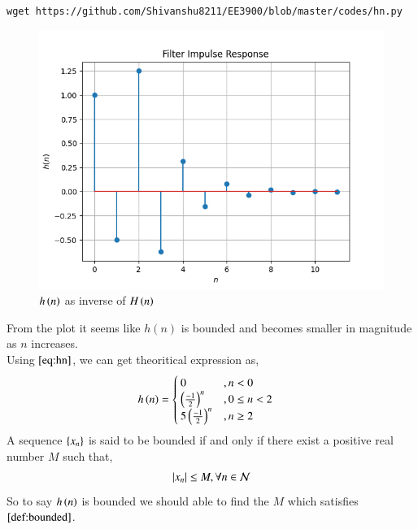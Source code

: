 \documentclass[journal,12pt,twocolumn]{IEEEtran}
\renewcommand\thesection{\arabic{section}}
\begin{document}
\begin{enumerate}[label=\thesection.\arabic*]
\begin{lstlisting}
wget https://github.com/Shivanshu8211/EE3900/blob/master/codes/hn.py
\end{lstlisting}
           \begin{figure}[ht!]
                \centering
                \includegraphics[width = \columnwidth]{figs/hn.png}
                \caption{$h\left(n\right)$ as inverse of $H\left(n\right)$}
                \label{hn}
           \end{figure}
           From the plot it seems like $h(n)$ is bounded and becomes smaller in magnitude as $n$ increases.\\
           Using $\eqref{eq:hn}$, we can get theoritical expression as,
           \begin{align}
                h\left(n\right) & = \begin{cases}
                                   0                      & , n < 0     \\
                                   \left(\frac{-1}{2}\right)^n  & , 0\leq n<2 \\
                                   5\left(\frac{-1}{2}\right)^n & , n \geq 2
                              \end{cases}\label{eq:hn_theo}
           \end{align}
           A sequence $\left\{x_n\right\}$ is said to be bounded if and only if there exist a positive real number $M$ such that,
           \begin{align}
                \left\vert x_n\right\vert \leq M , \forall n \in \mathcal{N}\label{def:bounded}
           \end{align}
           So to say $h\left(n\right)$ is bounded we should able to find the $M$ which satisfies $\eqref{def:bounded}$.\\

\end{enumerate}
\end{document}
